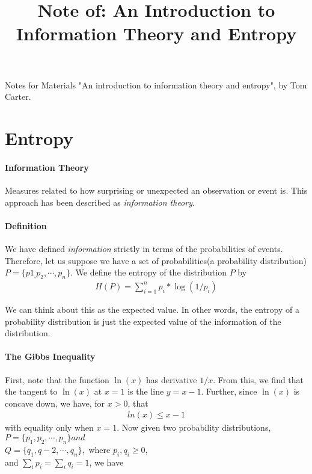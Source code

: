 \documentclass[10 pt,final]{article}
\title{Note of: An Introduction to Information Theory and Entropy}
\newcommand{\impo}[1]{{\color{magenta} #1}}
\begin{document}
\date{}

\maketitle


Notes for Materials "An introduction to information theory and entropy", by Tom Carter.

\section{Entropy}
\paragraph{Information Theory} Measures related to how surprising or unexpected an observation or event is. This approach has been described as \emph{information theory}.

\paragraph{Definition} We have defined \emph{information} strictly in terms of the probabilities of events. Therefore, let us suppose we have a set of probabilities(a probability distribution) $P=\{p1_,p_2, \cdots, p_n\}$. We define the entropy of the distribution $P$ by
\begin{align*}
H(P) = \sum^n_{i=1} p_i*\log{(1/p_i)}
\end{align*}

We can think about this as the expected value. In other words, the entropy of a probability distribution is just the expected value of the information of the distribution. 

\paragraph{\impo{The Gibbs Inequality}}
First, note that the function $\ln(x)$ has derivative $1/x$. From this, we find that the tangent to $\ln(x)$ at $x=1$ is the line $y=x-1$. Further, since $\ln(x)$ is concave down, we have, for $x >0$, that 
\begin{align*}
ln(x) \leq x -1
\end{align*}
with equality only when $x=1$. Now given two probability distributions,\\
$P=\{p_1, p_2, \cdots, p_n\} and $ \\
$Q=\{q_1, q-2, \cdots, q_n\},$ where $p_i, q_i \geq 0$, \\
and $\sum_i p_i = \sum_i q_i =1$, we have
\end{document}
